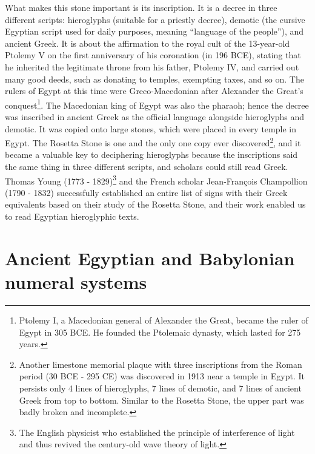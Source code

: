 \documentclass[b5paper]{article}
\begin{document}
What makes this stone important is its inscription. It is a decree in three different scripts: hieroglyphs (suitable for a priestly decree), demotic (the cursive Egyptian script used for daily purposes, meaning \enquote{language of the people}), and ancient Greek. It is about the affirmation to the royal cult of the 13-year-old Ptolemy V on the first anniversary of his coronation (in 196 BCE), stating that he inherited the legitimate throne from his father, Ptolemy IV, and carried out many good deeds, such as donating to temples, exempting taxes, and so on. The rulers of Egypt at this time were Greco-Macedonian after Alexander the Great's conquest\footnote{Ptolemy I, a Macedonian general of Alexander the Great, became the ruler of Egypt in 305 BCE. He founded the Ptolemaic dynasty, which lasted for 275 years.}. The Macedonian king of Egypt was also the pharaoh; hence the decree was inscribed in ancient Greek as the official language alongside hieroglyphs and demotic. It was copied onto large stones, which were placed in every temple in Egypt. The Rosetta Stone is one and the only one copy ever discovered\footnote{Another limestone memorial plaque with three inscriptions from the Roman period (30 BCE - 295 CE) was discovered in 1913 near a temple in Egypt. It persists only 4 lines of hieroglyphs, 7 lines of demotic, and 7 lines of ancient Greek from top to bottom. Similar to the Rosetta Stone, the upper part was badly broken and incomplete\cite{SH-Museum-24}.}, and it became a valuable key to deciphering hieroglyphs because the inscriptions said the same thing in three different scripts, and scholars could still read Greek. Thomas Young (1773 - 1829)\footnote{The English physicist who established the principle of interference of light and thus revived the century-old wave theory of light.} and the French scholar Jean-François Champollion (1790 - 1832) successfully established an entire list of signs with their Greek equivalents based on their study of the Rosetta Stone, and their work enabled us to read Egyptian hieroglyphic texts\cite{BM-RS-17}.

\section{Ancient Egyptian and Babylonian numeral systems}
\end{document}
